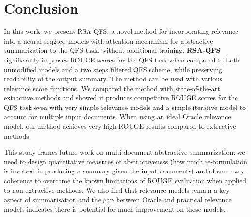 \documentclass[11pt,a4paper]{article}
\begin{document}
\section{Conclusion} 

In this work, we present RSA-QFS, a novel method for incorporating relevance into a neural seq2seq models with attention mechanism for abstractive summarization to the QFS task, without additional training. \textbf{RSA-QFS} significantly improves ROUGE scores for the QFS task when compared to both unmodified models and a two steps filtered QFS scheme, while preserving readability of the output summary. The method can be used with various relevance score functions. We compared the method with state-of-the-art extractive methods and showed it produces competitive ROUGE scores for the QFS task even with very simple relevance models and a simple iterative model to account for multiple input documents. When using an ideal Oracle relevance model, our method achieves very high ROUGE results compared to extractive methods. 

This study frames future work on multi-document abstractive summarization: we need to design quantitative measures of abstractiveness (how much re-formulation is involved in producing a summary given the input documents) and of summary coherence to overcome the known limitations of ROUGE evaluation when applied to non-extractive methods.  We also find that relevance models remain a key aspect of summarization and the gap between Oracle and practical relevance models indicates there is potential for much improvement on these models.



\end{document}
